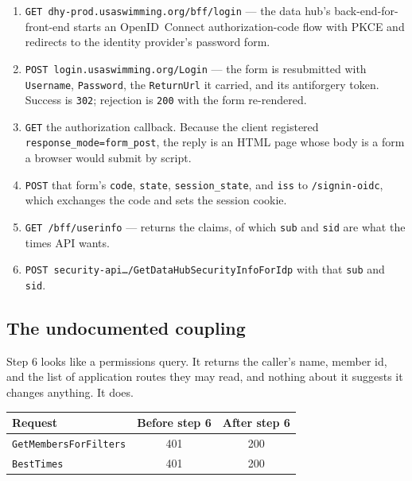 \documentclass[11pt]{article}
\newcommand{\code}[1]{\texttt{#1}}
\begin{document}
\begin{enumerate}[leftmargin=*]
\item \code{GET dhy-prod.usaswimming.org/bff/login} --- the data hub's
      back-end-for-front-end starts an OpenID~Connect
      authorization-code flow with PKCE and redirects to the identity
      provider's password form.
\item \code{POST login.usaswimming.org/Login} --- the form is
      resubmitted with \code{Username}, \code{Password}, the
      \code{ReturnUrl} it carried, and its antiforgery token.  Success
      is \code{302}; rejection is \code{200} with the form re-rendered.
\item \code{GET} the authorization callback.  Because the client
      registered \code{response\_mode=form\_post}, the reply is an HTML
      page whose body is a form a browser would submit by script.
\item \code{POST} that form's \code{code}, \code{state},
      \code{session\_state}, and \code{iss} to \code{/signin-oidc},
      which exchanges the code and sets the session cookie.
\item \code{GET /bff/userinfo} --- returns the claims, of which
      \code{sub} and \code{sid} are what the times API wants.
\item \code{POST security-api\dots/GetDataHubSecurityInfoForIdp} with
      that \code{sub} and \code{sid}.
\end{enumerate}

\subsection{The undocumented coupling}

Step 6 looks like a permissions query.  It returns the caller's name,
member id, and the list of application routes they may read, and
nothing about it suggests it changes anything.  It does.

\begin{center}
\begin{tabular}{lcc}
\toprule
\textbf{Request} & \textbf{Before step 6} & \textbf{After step 6} \\
\midrule
\code{GetMembersForFilters} & \textcolor{bad}{401} & \textcolor{good}{200} \\
\code{BestTimes}            & \textcolor{bad}{401} & \textcolor{good}{200} \\
\bottomrule
\end{tabular}
\end{center}
\end{document}
